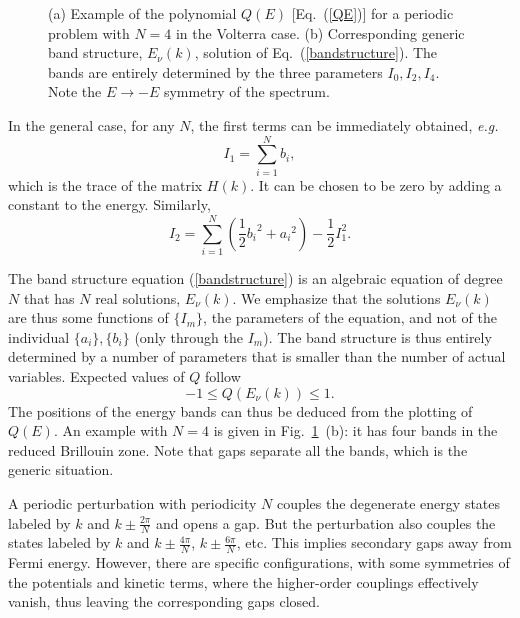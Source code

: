 \documentclass[]{revtex4-1}
\begin{document}
 \begin{figure}[t]
   \begin{center}
   \end{center}    \caption{ (a) Example of the polynomial $Q(E)$ [Eq.~(\ref{QE})] for a periodic problem with $N=4$ in the Volterra case. (b) Corresponding generic band structure, $E_{\nu}(k)$, solution of Eq.~(\ref{bandstructure}). 
     The bands are entirely determined by the three parameters $I_0,I_2,I_4$. Note the $E \rightarrow -E $ symmetry of the spectrum. }
  \label{exbs}
 \end{figure}


In the general case, for any $N$, the first terms can be immediately obtained, \textit{e.g.}
\begin{equation}
  I_1 = \sum_{i=1}^{N} b_i, \label{I1def} \end{equation}
which is the trace of the matrix $H(k)$. It can be chosen to be zero by adding a constant to the energy. Similarly,
\begin{equation}
  I_2 = \sum_{i=1}^{N} \left( \frac{1}{2}{b_i}^2+{a_i}^2 \right) - \frac{1}{2} I_1^2. \label{I2def}
  \end{equation}

The band structure equation (\ref{bandstructure}) is  an algebraic equation of degree $N$ that has $N$ real solutions,  $E_{\nu}(k)$.
 We emphasize that the solutions $E_{\nu}(k)$ are thus some functions of $\{I_m\}$, the parameters of the equation, and not of the individual $\{a_i\}, \{b_i\}$ (only through the $I_m$).
The band structure is thus entirely determined by a number of parameters that is smaller than the number of actual variables.
Expected values of $Q$ follow \begin{equation} -1\leq Q(E_{\nu}(k)) \leq 1. \end{equation} The positions of the energy bands can thus be deduced from the plotting of $Q(E)$. An example with $N=4$ is given in Fig.~\ref{exbs}~(b): it has four bands in the reduced Brillouin zone. Note that gaps separate all the bands, which is the generic situation.

A periodic perturbation with periodicity $N$ couples the degenerate energy states labeled by $k$ and $k \pm \frac{2\pi}{N}$ and opens a gap. But the perturbation also couples the states labeled by $k$ and $k\pm \frac{4\pi}{N}$, $k\pm \frac{6\pi}{N}$, etc. This implies secondary gaps away from Fermi energy. 
 However, there are specific configurations, with some symmetries of the potentials and kinetic terms, where the higher-order couplings effectively vanish, thus leaving the corresponding gaps closed. %
\end{document}
